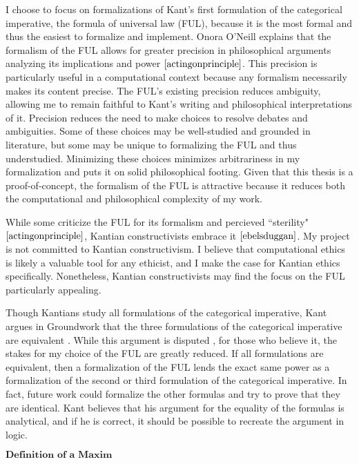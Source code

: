 \begin{isabellebody}
\begin{isamarkuptext}
I choose to focus on formalizations of Kant's first formulation of the categorical imperative,
the formula of universal law (FUL), because it is the most formal and thus the easiest to formalize and implement. 
Onora O'Neill explains that the formalism of the FUL allows 
for greater precision in philosophical arguments analyzing its implications and power $\cite[33]{actingonprinciple}$. This precision 
is particularly useful in a computational context because any formalism necessarily makes its content 
precise. The FUL's existing precision reduces ambiguity, allowing me to remain faithful to Kant's writing and 
philosophical interpretations of it. Precision reduces the need to make choices to resolve debates 
and ambiguities. Some of these choices may be well-studied and grounded in literature, 
but some may be unique to formalizing the FUL and thus understudied. Minimizing these choices minimizes 
arbitrariness in my formalization and puts it on solid philosophical footing. Given that this thesis is a proof-of-concept, 
the formalism of the FUL is attractive because it reduces both the computational and philosophical complexity of my work. 

While some criticize the FUL for its formalism and percieved ``sterility" $\cite[33]{actingonprinciple}$, 
Kantian constructivists embrace it $\cite[173]{ebelsduggan}$. My project is not committed to Kantian constructivism. 
I believe that computational ethics is likely a valuable tool for any ethicist, and I make the case 
for Kantian ethics specifically. Nonetheless, Kantian constructivists may find the focus on 
the FUL particularly appealing. 

Though Kantians study all formulations of the categorical imperative, Kant argues in Groundwork 
that the three formulations of the categorical imperative are equivalent \cite{groundwork}. While this 
argument is disputed \cite{sepkant}, for those who believe it, the
stakes for my choice of the FUL are greatly reduced. If all formulations are equivalent, then a formalization of the FUL
lends the exact same power as a formalization of the second or third formulation of the categorical 
imperative. In fact, future work could formalize the other formulas and try to prove that they 
are identical. Kant believes that his argument for the equality of the formulas is analytical, and
if he is correct, it should be possible to recreate the argument in logic.

$\textbf{Definition of a Maxim}$


\end{isamarkuptext}
\end{isabellebody}

